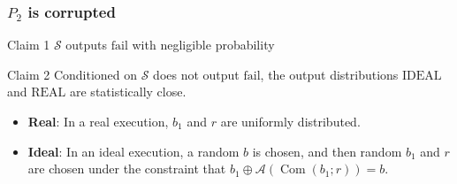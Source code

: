 \documentclass{beamer}
\begin{document}
    \begin{frame}
        \frametitle{$P_{2}$ is corrupted}
    
        \begin{block}{Claim 1}
            $\mathcal{S}$ outputs $\mathrm{fail}$ with negligible probability
        \end{block}
    
        \begin{block}{Claim 2}
            Conditioned on $\mathcal{S}$ does not output $\mathrm{fail}$, the output distributions $\mathrm{IDEAL}$ and $\mathrm{REAL}$ are statistically close. 
        \end{block}
        \begin{itemize}
            \item \textbf{Real}: In a real execution, $b_{1}$ and $r$ are uniformly distributed.
            \item \textbf{Ideal}: In an ideal execution, a random $b$ is chosen, and then random $b_{1}$ and $r$ are chosen under the constraint that $b_{1} \oplus \mathcal{A}\left(\operatorname{Com}\left(b_{1} ; r\right)\right)=b$.
        \end{itemize}
    \end{frame}
\end{document}
